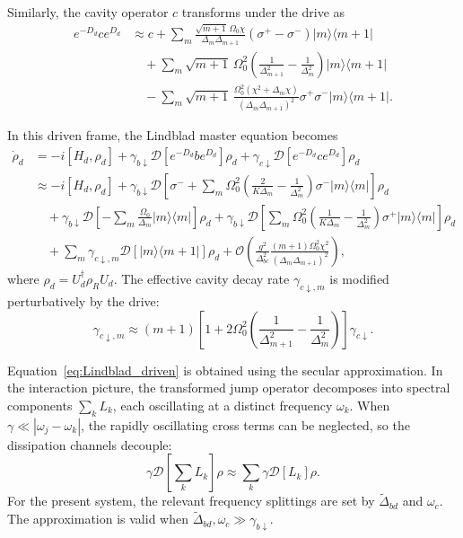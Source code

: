 Similarly, the cavity operator $c$ transforms under the drive as
\begin{align}
\label{eq:transformc}
    e^{-D_d} c e^{D_d}
    &\approx c + \sum_m \frac{\sqrt{m+1}\,\Omega_0 \chi}{\Delta_m \Delta_{m+1}} (\sigma^+ - \sigma^-) |m\rangle\langle m+1| \nonumber \\
    &\quad + \sum_m \sqrt{m+1}\,\Omega_0^2 \left( \frac{1}{\Delta_{m+1}^2} - \frac{1}{\Delta_m^2} \right) |m\rangle\langle m+1| \nonumber \\
    &\quad - \sum_m \sqrt{m+1}\,\frac{\Omega_0^2 (\chi^2 + \Delta_m \chi)}{(\Delta_m \Delta_{m+1})^2} \sigma^+ \sigma^- |m\rangle\langle m+1|.
\end{align}

In this driven frame, the Lindblad master equation becomes
\begin{align}
\label{eq:Lindblad_driven}
    \dot{\rho}_d
    &= -i[H_d, \rho_d] + \gamma_{b\downarrow} \mathcal{D}\!\left[e^{-D_d} b e^{D_d}\right] \rho_d + \gamma_{c\downarrow} \mathcal{D}\!\left[e^{-D_d} c e^{D_d}\right] \rho_d \nonumber \\
    &\approx -i[H_d, \rho_d] + \gamma_{b\downarrow} \mathcal{D}\!\left[ \sigma^- + \sum_m \Omega_0^2 \left( \frac{2}{K \Delta_m} - \frac{1}{\Delta_m^2} \right) \sigma^- |m\rangle\langle m| \right] \rho_d \nonumber \\
    &\quad + \gamma_{b\downarrow} \mathcal{D}\!\left[ -\sum_m \frac{\Omega_0}{\Delta_m} |m\rangle\langle m| \right] \rho_d + \gamma_{b\downarrow} \mathcal{D}\!\left[ \sum_m \Omega_0^2 \left( \frac{1}{K \Delta_m} - \frac{1}{\Delta_m^2} \right) \sigma^+ |m\rangle\langle m| \right] \rho_d \nonumber \\
    &\quad + \sum_m \gamma_{c\downarrow, m} \mathcal{D}[|m\rangle\langle m+1|] \rho_d + \mathcal{O}\!\left( \frac{g^2}{\Delta_{bc}^2} \frac{(m+1)\Omega_0^2 \chi^2}{(\Delta_m \Delta_{m+1})^2} \right),
\end{align}
where $\rho_d = U_d^\dagger \rho_R U_d$. The effective cavity decay rate $\gamma_{c\downarrow, m}$ is modified perturbatively by the drive:
\begin{equation}
    \gamma_{c\downarrow, m} \approx (m+1) \left[ 1 +2 \Omega_0^2 \left( \frac{1}{\Delta_{m+1}^2} - \frac{1}{\Delta_m^2} \right) \right] \gamma_{c\downarrow}.
\end{equation}

Equation~\eqref{eq:Lindblad_driven} is obtained using the secular approximation. In the interaction picture, the transformed jump operator decomposes into spectral components $\sum_k L_k$, each oscillating at a distinct frequency $\omega_k$. When $\gamma \ll |\omega_j - \omega_k|$, the rapidly oscillating cross terms can be neglected, so the dissipation channels decouple:
\begin{equation}
    \gamma \mathcal{D}\!\left[ \sum_k L_k \right] \rho \approx \sum_k \gamma \mathcal{D}[L_k] \rho.
\end{equation}
For the present system, the relevant frequency splittings are set by $\widetilde{\Delta}_{bd}$ and $\omega_c$. The approximation is valid when $\widetilde{\Delta}_{bd}, \omega_c \gg \gamma_{b\downarrow}$.

